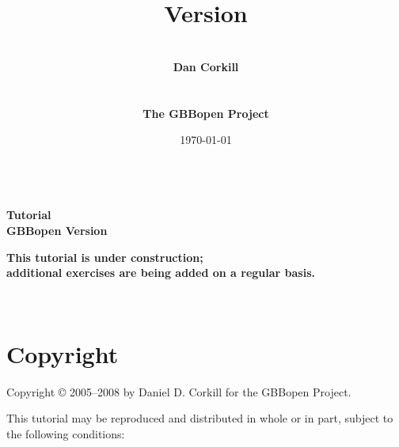 \documentclass[10pt,twoside,english,pdftex]{article}
\title{\vspace{3in}{\LARGE\textbf{GBBopen Tutorial}}\\[14pt] 
{\Large\textbf{Version \gbbopenversion}}}
\author{\vspace{1in}~\\{\Large\textbf{Dan Corkill}}\\~\\~\\
  {\Large\textbf{The GBBopen Project}}\\[4pt]
  {\large\textbf{\xsitelink{http://GBBopen.org}{http://GBBopen.org}}}}
\date{\today\\[4pt] \hhmm~\timezone}
\newcommand{\inprogress}{\vfill\textcolor{darkergray}{\textsf{\textbf{This
        tutorial is under construction;\\additional exercises are being added
        on a regular basis.}}}}
\begin{document}
\T{}
\T\pagestyle{plain}
\T\thispagestyle{empty}
\T\raggedright
\T\sloppy
\T{}\baselineskip
\T\parindent=0pt
\T\maketitle
\T\renewcommand{\headrulewidth}{0pt}

\T\begin{ifhtml}
{\LARGE\bf Tutorial}\\
{\large\bf GBBopen Version \gbbopenversion}
\T\end{ifhtml}

\begin{center}
\inprogress\\
\end{center}


\T\begin{ifhtml}
  \label{sec:introduction}%
  
  \setcounter{htmlautomenu}{0}
\T\end{ifhtml}

\T\thispagestyle{empty}


\T\newpage
\T~
\T\vfill
\W{}
\W\section*{Copyright}

Copyright \copyright{} 2005--2008 by Daniel D. Corkill for the
GBBopen Project.

This tutorial may be reproduced and distributed in whole or in
part, subject to the following conditions: 
\end{document}
